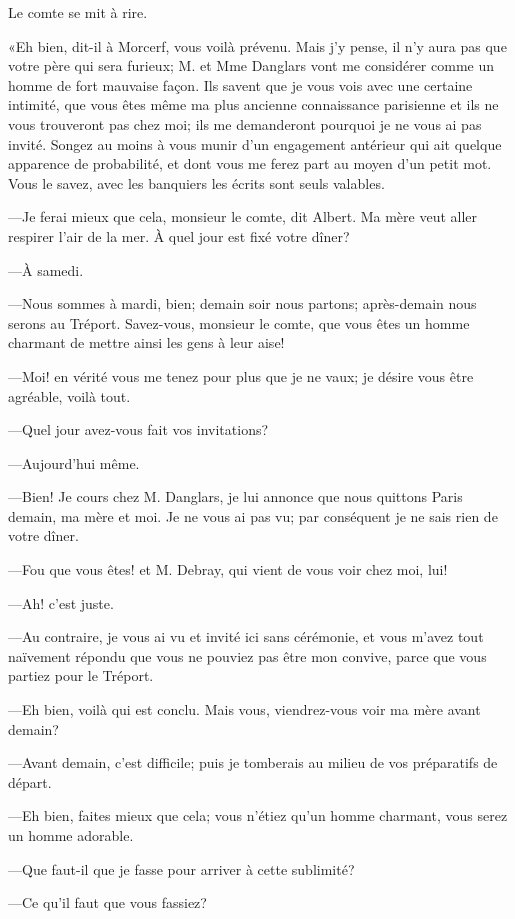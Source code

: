 Le comte se mit à rire.  

«Eh bien, dit-il à Morcerf, vous voilà prévenu. Mais j'y pense, il n'y aura pas que votre père qui sera furieux; M. et Mme Danglars vont me considérer comme un homme de fort mauvaise façon. Ils savent que je vous vois avec une certaine intimité, que vous êtes même ma plus ancienne connaissance parisienne et ils ne vous trouveront pas chez moi; ils me demanderont pourquoi je ne vous ai pas invité. Songez au moins à vous munir d'un engagement antérieur qui ait quelque apparence de probabilité, et dont vous me ferez part au moyen d'un petit mot. Vous le savez, avec les banquiers les écrits sont seuls valables. 

—Je ferai mieux que cela, monsieur le comte, dit Albert. Ma mère veut aller respirer l'air de la mer. À quel jour est fixé votre dîner? 

—À samedi. 

—Nous sommes à mardi, bien; demain soir nous partons; après-demain nous serons au Tréport. Savez-vous, monsieur le comte, que vous êtes un homme charmant de mettre ainsi les gens à leur aise! 

—Moi! en vérité vous me tenez pour plus que je ne vaux; je désire vous être agréable, voilà tout. 

—Quel jour avez-vous fait vos invitations? 

—Aujourd'hui même. 

—Bien! Je cours chez M. Danglars, je lui annonce que nous quittons Paris demain, ma mère et moi. Je ne vous ai pas vu; par conséquent je ne sais rien de votre dîner. 

—Fou que vous êtes! et M. Debray, qui vient de vous voir chez moi, lui! 

—Ah! c'est juste. 

—Au contraire, je vous ai vu et invité ici sans cérémonie, et vous m'avez tout naïvement répondu que vous ne pouviez pas être mon convive, parce que vous partiez pour le Tréport. 

—Eh bien, voilà qui est conclu. Mais vous, viendrez-vous voir ma mère avant demain? 

—Avant demain, c'est difficile; puis je tomberais au milieu de vos préparatifs de départ. 

—Eh bien, faites mieux que cela; vous n'étiez qu'un homme charmant, vous serez un homme adorable.  

—Que faut-il que je fasse pour arriver à cette sublimité? 

—Ce qu'il faut que vous fassiez? 

